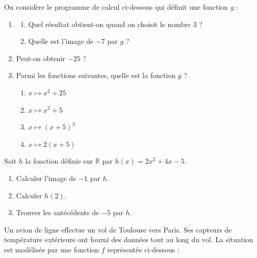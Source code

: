 \documentclass[a4paper]{article}
\begin{document}
\exo On considère le programme de calcul ci-dessous qui définit une fonction $g$ :

\begin{center}
\end{center}

\begin{enumerate}
  \item 
    \begin{enumerate}
      \item Quel résultat obtient-on quand on choisit le nombre $3$ ?
      \item Quelle est l'image de $-7$ par $g$ ?
    \end{enumerate}
  \item Peut-on obtenir $-25$ ?
  \item Parmi les fonctions suivantes, quelle est la fonction $g$ ?
    \begin{multicols}{4}
      \begin{enumerate}
	\item $x\mapsto x^2+25$
	\item $x\mapsto x^2+5$
	\item $x\mapsto (x+5)^2$
	\item $x\mapsto 2(x+5)$
      \end{enumerate}
    \end{multicols}
\end{enumerate}

\bigskip

\exo Soit $h$ la fonction définie sur $\mathbb{R}$ par $h(x)=2x^2+4x-5$.
\begin{enumerate}
  \item Calculer l'image de $-1$ par $h$.
  \item Calculer $h(2)$.
  \item Trouver les antécédents de $-5$ par $h$.
\end{enumerate}

\pagebreak

\exo Un avion de ligne effectue un vol de Toulouse vers Paris. Ses capteurs de température extérieure ont fourni des données tout au long du vol. La situation est modélisée par une fonction $f$ représentée ci-dessous :
\end{document}

